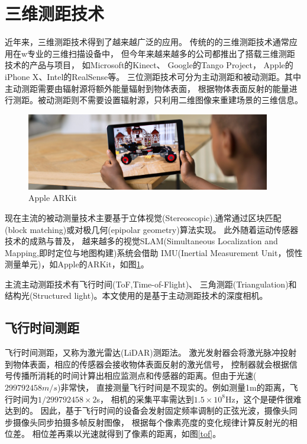 \section{三维测距技术}
近年来，三维测距技术得到了越来越广泛的应用。
传统的的三维测距技术通常应用在w专业的三维扫描设备中，
但今年来越来越多的公司都推出了搭载三维测距技术的产品与项目，
如Microsoft的Kinect\cite{microsoft_kinect}、
Google的Tango\cite{google_tango} Project，
Apple的iPhone X\cite{apple_iphoneX}、Intel的RealSense\cite{intel_realsense}等。
三位测距技术可分为主动测距和被动测距。其中主动测距需要由辐射源将额外能量辐射到物体表面，
根据物体表面反射的能量进行测距。被动测距则不需要设置辐射源，只利用二维图像来重建场景的三维信息。

\begin{figure}[h]
    \centering
    \includegraphics[width=0.95\textwidth]{./Pictures/ARKit.eps}
    \caption{Apple ARKit}
    \label{arkit}
\end{figure}
现在主流的被动测量技术主要基于立体视觉(Stereoscopic),通常通过区块匹配(block matching)或对极几何(epipolar geometry)算法实现。
此外随着运动传感器技术的成熟与普及，
越来越多的视觉SLAM(Simultaneous Localization and Mapping,即时定位与地图构建)系统会借助
IMU(Inertial Measurement Unit，惯性测量单元)，如Apple的ARKit\cite{apple_arkit}，如图\ref{arkit}。

主流主动测距技术有飞行时间(ToF,Time-of-Flight)、
三角测距(Triangulation)和结构光(Structured light)。本文使用的是基于主动测距技术的深度相机。
\subsection{飞行时间测距}
飞行时间测距，又称为激光雷达(LiDAR)测距法。
激光发射器会将激光脉冲投射到物体表面，相应的传感器会接收物体表面反射的激光信号，
控制器就会根据信号传播所消耗的时间计算出相应监测点和传感器的距离。但由于光速(\(299792458 m/s\))非常快，
直接测量飞行时间是不现实的。例如测量1m的距离，飞行时间为\(1/299792458 \times 2\)s，
相机的采集平率需达到\(1.5 \times 10^8\)Hz，这个是硬件很难达到的。
因此，基于飞行时间的设备会发射固定频率调制的正弦光波，摄像头同步摄像头同步拍摄多帧反射图像，
根据每个像素亮度的变化规律计算反射光的相位差。
相位差再乘以光速就得到了像素的距离，如图\ref{tof}。

